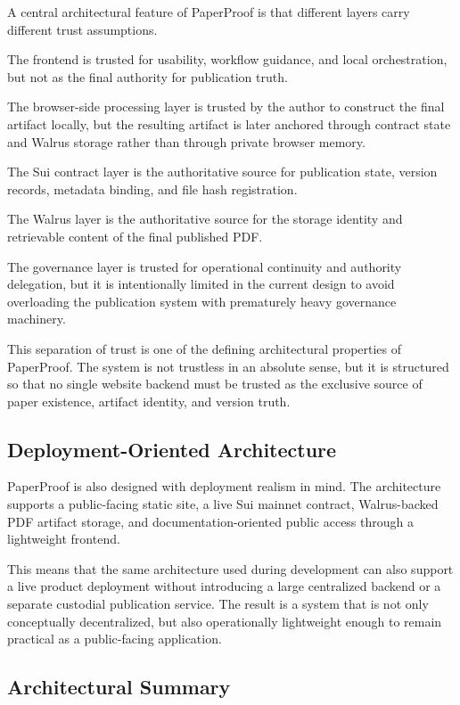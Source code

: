 \documentclass[journal]{IEEEtran}
\begin{document}
A central architectural feature of PaperProof is that different layers carry different trust assumptions.

The frontend is trusted for usability, workflow guidance, and local orchestration, but not as the final authority for publication truth.

The browser-side processing layer is trusted by the author to construct the final artifact locally, but the resulting artifact is later anchored through contract state and Walrus storage rather than through private browser memory.

The Sui contract layer is the authoritative source for publication state, version records, metadata binding, and file hash registration.

The Walrus layer is the authoritative source for the storage identity and retrievable content of the final published PDF.

The governance layer is trusted for operational continuity and authority delegation, but it is intentionally limited in the current design to avoid overloading the publication system with prematurely heavy governance machinery.

This separation of trust is one of the defining architectural properties of PaperProof. The system is not trustless in an absolute sense, but it is structured so that no single website backend must be trusted as the exclusive source of paper existence, artifact identity, and version truth.

\subsection{Deployment-Oriented Architecture}

PaperProof is also designed with deployment realism in mind. The architecture supports a public-facing static site, a live Sui mainnet contract, Walrus-backed PDF artifact storage, and documentation-oriented public access through a lightweight frontend.

This means that the same architecture used during development can also support a live product deployment without introducing a large centralized backend or a separate custodial publication service. The result is a system that is not only conceptually decentralized, but also operationally lightweight enough to remain practical as a public-facing application.

\subsection{Architectural Summary}
\end{document}
